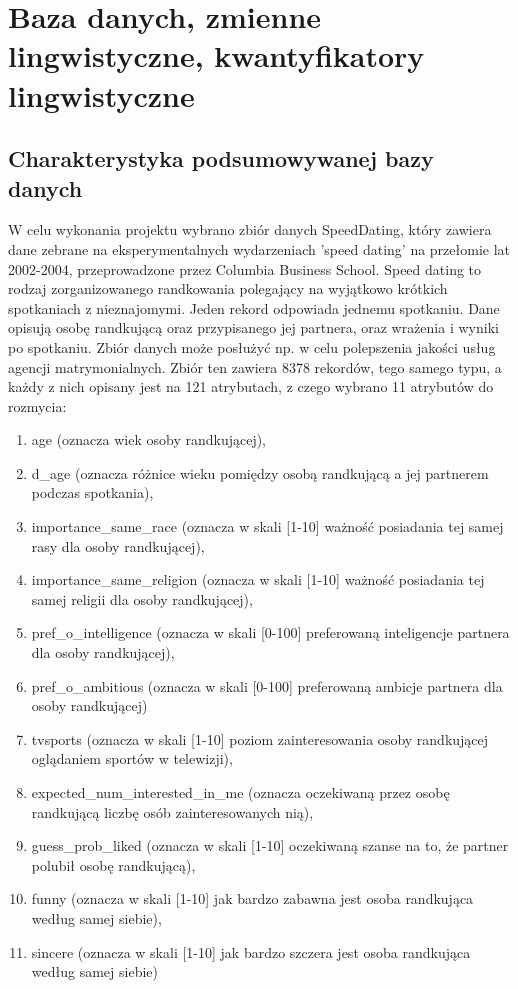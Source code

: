 \documentclass{classrep}
\begin{document}
\section{Baza danych, zmienne lingwistyczne, kwantyfikatory lingwistyczne}

\subsection{Charakterystyka podsumowywanej bazy danych}

W celu wykonania projektu wybrano zbiór danych SpeedDating\cite{database}, który zawiera dane zebrane na eksperymentalnych wydarzeniach 'speed dating' na przełomie lat 2002-2004, przeprowadzone przez Columbia Business School. 
Speed dating to rodzaj zorganizowanego randkowania polegający na wyjątkowo krótkich spotkaniach z nieznajomymi. Jeden rekord odpowiada jednemu spotkaniu. Dane opisują osobę randkującą oraz przypisanego jej partnera, oraz wrażenia i wyniki po spotkaniu. 
Zbiór danych może posłużyć np. w celu polepszenia jakości usług agencji matrymonialnych.
Zbiór ten zawiera 8378 rekordów, tego samego typu, a każdy z nich opisany jest na 121 atrybutach, z czego wybrano 11 atrybutów do rozmycia:
\begin{enumerate}
  \item age (oznacza wiek osoby randkującej),
  \item d\_age (oznacza różnice wieku pomiędzy osobą randkującą a jej partnerem podczas spotkania),
  \item importance\_same\_race (oznacza w skali [1-10] ważność posiadania tej samej rasy dla osoby randkującej), 
  \item importance\_same\_religion (oznacza w skali [1-10] ważność posiadania tej samej religii dla osoby randkującej), 
  \item pref\_o\_intelligence (oznacza w skali [0-100] preferowaną inteligencje partnera dla osoby randkującej),
  \item pref\_o\_ambitious (oznacza w skali [0-100] preferowaną ambicje partnera dla osoby randkującej)
  \item tvsports (oznacza w skali [1-10] poziom zainteresowania osoby randkującej oglądaniem sportów w telewizji),
  \item expected\_num\_interested\_in\_me (oznacza oczekiwaną przez osobę randkującą liczbę osób zainteresowanych nią),
  \item guess\_prob\_liked (oznacza w skali [1-10] oczekiwaną szanse na to, że partner polubił osobę randkującą),
  \item funny (oznacza w skali [1-10] jak bardzo zabawna jest osoba randkująca według samej siebie),
  \item sincere (oznacza w skali [1-10] jak bardzo szczera jest osoba randkująca według samej siebie)
\end{enumerate}
\end{document}
